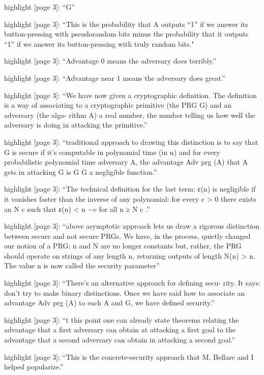 highlight {[}page 3{]}: ``G''

highlight {[}page 3{]}: ``This is the probability that A outputs ``1''
if we answer its button-pressing with pseudorandom bits minus the
probability that it outputs ``1'' if we answer its button-pressing with
truly random bits."

highlight {[}page 3{]}: ``Advantage 0 means the adversary does
terribly.''

highlight {[}page 3{]}: ``Advantage near 1 means the adversary does
great.''

highlight {[}page 3{]}: ``We have now given a cryptographic definition.
The definition is a way of associating to a cryptographic primitive (the PRG G) and an adversary (the algo- rithm A) a real number, the number telling us how well the adversary is doing in attacking the primitive.''

highlight {[}page 3{]}: ``traditional approach to drawing this distinction is to say that G is secure if it's computable in polynomial time (in n) and for every probabilistic polynomial time adversary A, the
advantage Adv prg (A) that A gets in attacking G is G G a negligible
function.''

highlight {[}page 3{]}: ``The technical definition for the last term: ε(n) is negligible if it vanishes faster than the inverse of any polynomial: for every c \textgreater{} 0 there exists an N c such that
ε(n) \textless{} n −c for all n ≥ N c .''

highlight {[}page 3{]}: ``above asymptotic approach lets us draw a
rigorous distinction between secure and not secure PRGs. We have, in the
process, quietly changed our notion of a PRG: n and N are no longer
constants but, rather, the PRG should operate on strings of any length
n, returning outputs of length N(n) \textgreater{} n. The value n is now
called the security parameter''

highlight {[}page 3{]}: ``There's an alternative approach for defining
secu- rity. It says: don't try to make binary distinctions. Once we have said how to associate an advantage Adv prg (A) to each A and G, we have defined security.''

highlight {[}page 3{]}: ``t this point one can already state theorems
relating the advantage that a first adversary can obtain at attacking a
first goal to the advantage that a second adversary can obtain in
attacking a second goal.''

highlight {[}page 3{]}: ``This is the concrete-security approach that M.
Bellare and I helped popularize.''

